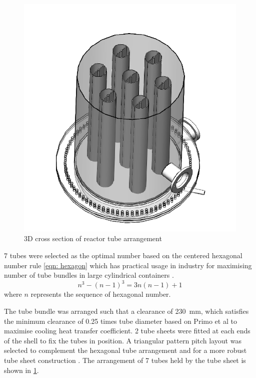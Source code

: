 \begin{figure}
    \centering
    \includegraphics[width=\linewidth]{chapters/2-reaction/figures/FYD reactor 7 tubes cross section 3D.PNG}
    \caption{3D cross section of reactor tube arrangement}
    \label{fig:reactortubearrangement}
\end{figure}
7 tubes were selected as the optimal number based on the centered hexagonal number rule \cref{eqn: hexagon} which has practical usage in industry for maximising number of tube bundles in large cylindrical containers \cite{noauthor_realiable_2018}. 
\begin{equation}
    n^3 - (n-1)^3 = 3n(n-1)+1
    \label{eqn: hexagon}
\end{equation}
where $n$ represents the sequence of hexagonal number. 

The tube bundle was arranged such that a clearance of \SI{230}{\milli \metre}, which satisfies the minimum clearance of 0.25 times tube diameter based on Primo et al \cite{primo_shell_2012} to maximise cooling heat transfer coefficient. 2 tube sheets were fitted at each ends of the shell to fix the tubes in position. A triangular pattern pitch layout was selected to complement the hexagonal tube arrangement and for a more robust tube sheet construction \cite{primo_shell_2012}. The arrangement of 7 tubes held by the tube sheet is shown in \cref{fig:reactortubearrangement}.

